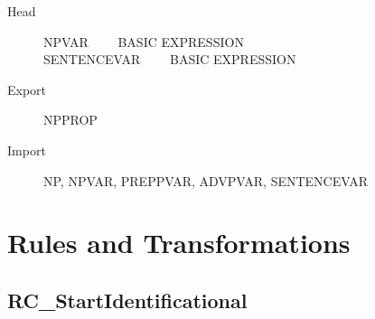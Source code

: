 \begin{description}
  \item[Head]  NPVAR \ \ \ \ BASIC EXPRESSION\\
               SENTENCEVAR \ \ \ \ BASIC EXPRESSION
  \item[Export] NPPROP
  \item[Import] NP, NPVAR, PREPPVAR, ADVPVAR, SENTENCEVAR
\end{description}

\newpage
\section{Rules and Transformations}

\subsection{RC\_StartIdentificational}
